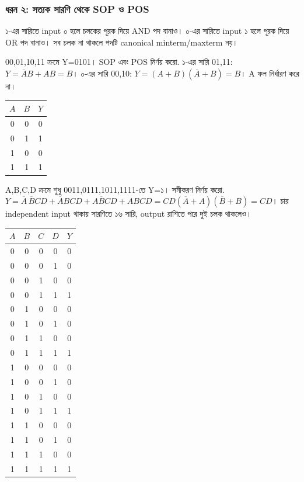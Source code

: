 \subsubsection*{ধরন ২: সত্যক সারণি থেকে SOP ও POS}
১-এর সারিতে input ০ হলে চলকের পূরক দিয়ে AND পদ বানাও। ০-এর সারিতে input ১ হলে পূরক দিয়ে OR পদ বানাও। সব চলক না থাকলে পদটি canonical minterm/maxterm নয়।
\par\smallskip\noindent\begin{minipage}{\linewidth}
00,01,10,11 ক্রমে Y=0101। SOP এবং POS নির্ণয় করো.
\chThreeAnswer ১-এর সারি 01,11: $Y=\overline AB+AB=B$। ০-এর সারি 00,10: $Y=(A+B)(\overline A+B)=B$। A ফল নির্ধারণ করে না।
\begin{center}\begin{tabular}{|c|c|c|}\hline
$A$ & $B$ & $Y$\\\hline
0 & 0 & 0\\\hline
0 & 1 & 1\\\hline
1 & 0 & 0\\\hline
1 & 1 & 1\\\hline
\end{tabular}\end{center}

\end{minipage}\par\smallskip
\par\smallskip\noindent\begin{minipage}{\linewidth}
A,B,C,D ক্রমে শুধু 0011,0111,1011,1111-তে Y=১। সমীকরণ নির্ণয় করো.
\chThreeAnswer $Y=\overline A\,\overline BCD+\overline ABCD+A\overline BCD+ABCD=CD(\overline A+A)(\overline B+B)=CD$। চার independent input থাকায় সারণিতে ১৬ সারি, output রাশিতে পরে দুই চলক থাকলেও।
\begin{center}\begin{tabular}{|c|c|c|c|c|}\hline
$A$ & $B$ & $C$ & $D$ & $Y$\\\hline
0 & 0 & 0 & 0 & 0\\\hline
0 & 0 & 0 & 1 & 0\\\hline
0 & 0 & 1 & 0 & 0\\\hline
0 & 0 & 1 & 1 & 1\\\hline
0 & 1 & 0 & 0 & 0\\\hline
0 & 1 & 0 & 1 & 0\\\hline
0 & 1 & 1 & 0 & 0\\\hline
0 & 1 & 1 & 1 & 1\\\hline
1 & 0 & 0 & 0 & 0\\\hline
1 & 0 & 0 & 1 & 0\\\hline
1 & 0 & 1 & 0 & 0\\\hline
1 & 0 & 1 & 1 & 1\\\hline
1 & 1 & 0 & 0 & 0\\\hline
1 & 1 & 0 & 1 & 0\\\hline
1 & 1 & 1 & 0 & 0\\\hline
1 & 1 & 1 & 1 & 1\\\hline
\end{tabular}\end{center}

\end{minipage}\par\smallskip
{}
